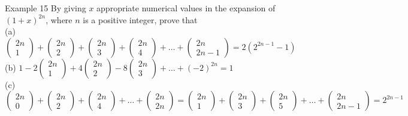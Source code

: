 \documentclass{beamer}
\begin{document}
\begin{frame}{Example 15}
By giving $x$ appropriate numerical values in the expansion of $(1+x)^{2 n}$, where $n$ is a positive integer, prove that\\
(a) $ \left(\begin{array}{c}2 n \\ 1\end{array}\right) + \left(\begin{array}{c}2 n \\ 2\end{array}\right) + \left(\begin{array}{c}2 n \\ 3\end{array}\right) + \left(\begin{array}{c}2 n \\ 4\end{array}\right) + \ldots +\left(\begin{array}{c}2 n \\ 2n-1\end{array}\right)=2(2^{2n-1}-1)$\\
(b) $1-2\left(\begin{array}{c}2 n \\ 1\end{array}\right)+4\left(\begin{array}{c}2 n \\ 2\end{array}\right)-8\left(\begin{array}{c}2 n \\ 3\end{array}\right)+\ldots+(-2)^{2n}=1$\\
(c) $\left(\begin{array}{c}2 n \\ 0\end{array}\right)+\left(\begin{array}{c}2 n \\ 2\end{array}\right)+\left(\begin{array}{c}2 n \\ 4\end{array}\right)+\ldots+\left(\begin{array}{c}2 n \\ 2n\end{array}\right)=\left(\begin{array}{c}2 n \\ 1\end{array}\right)+\left(\begin{array}{c}2 n \\ 3\end{array}\right)+\left(\begin{array}{c}2 n \\ 5\end{array}\right)+\ldots+\left(\begin{array}{c}2 n \\ 2n-1\end{array}\right)=2^{2n-1}$
\end{frame}
\end{document}
